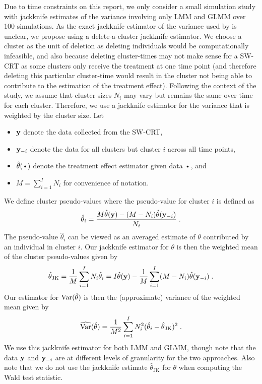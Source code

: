 \documentclass[10pt]{article}
\begin{document}
Due to time constraints on this report, we only consider a small simulation study with jackknife estimates of the variance involving only LMM and GLMM over 100 simulations. As the exact jackknife estimator of the variance used by \citeauthor{Hussey:2007} is unclear, we propose using a delete-a-cluster jackknife estimator. We choose a cluster as the unit of deletion as deleting individuals would be computationally infeasible, and also because deleting cluster-times may not make sense for a SW-CRT as some clusters only receive the treatment at one time point (and therefore deleting this particular cluster-time would result in the cluster not being able to contribute to the estimation of the treatment effect). Following the context of the study, we assume that cluster sizes $N_i$ may vary but remains the same over time for each cluster. Therefore, we use a jackknife estimator for the variance that is weighted by the cluster size. Let
\begin{itemize}

\item
$\mathbf{y}$ denote the data collected from the SW-CRT,

\item
$\mathbf{y}_{-i}$ denote the data for all clusters but cluster $i$ across all time points,

\item
$\hat{\theta}(\argdot)$ denote the treatment effect estimator given data $\argdot$, and

\item
$M=\sum_{i=1}^IN_i$ for convenience of notation.

\end{itemize}
We define cluster pseudo-values where the pseudo-value for cluster $i$ is defined as
\[
\hat{\theta}_i = \frac{M\hat{\theta}(\mathbf{y}) - (M-N_i)\hat{\theta}(\mathbf{y}_{-i})}{N_i} \;.
\]
The pseudo-value $\hat{\theta}_i$ can be viewed as an averaged estimate of $\theta$ contributed by an individual in cluster $i$. Our jackknife estimator for $\theta$ is then the weighted mean of the cluster pseudo-values given by
\[
\hat{\theta}_{\text{JK}} = \frac{1}{M}\sum_{i=1}^I N_i\hat{\theta}_i = I\hat{\theta}(\mathbf{y}) - \frac{1}{M}\sum_{i=1}^I(M-N_i)\hat{\theta}(\mathbf{y}_{-i}) \;.
\]
Our estimator for $\mathrm{Var}(\hat{\theta})$ is then the (approximate) variance of the weighted mean given by
\[
\widehat{\mathrm{Var}}(\hat{\theta}) = \frac{1}{M^2}\sum_{i=1}^IN_i^2(\hat{\theta}_i-\hat{\theta}_{\text{JK}})^2 \;.
\]
We use this jackknife estimator for both LMM and GLMM, though note that the data $\mathbf{y}$ and $\mathbf{y}_{-i}$ are at different levels of granularity for the two approaches. Also note that we do not use the jackknife estimate $\hat{\theta}_{\text{JK}}$ for $\theta$ when computing the Wald test statistic.
\end{document}
